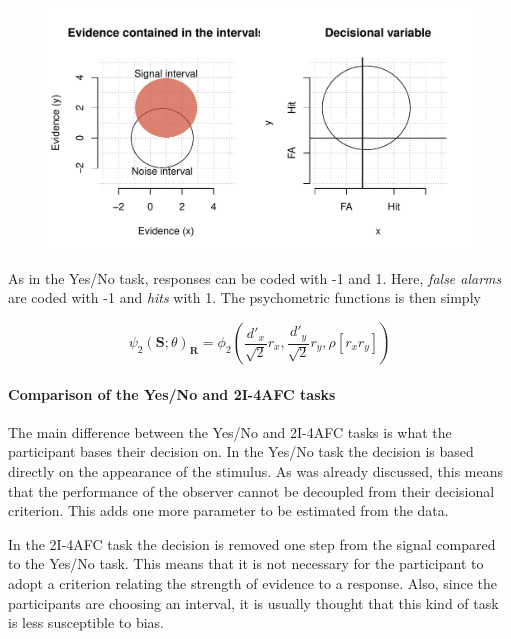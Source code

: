 \documentclass{article}\usepackage{knitr}
\begin{document}
\begin{figure}
\centering
\begin{knitrout}
\color{fgcolor}
\includegraphics[width=\maxwidth]{figure/unnamed-chunk-10-1} 

\end{knitrout}
\caption{}
\label{fig:2I4AFC}
\end{figure}

As in the Yes/No task, responses can be coded with -1 and 1. Here, \textit{false alarms} are coded with -1 and \textit{hits} with 1.  The psychometric functions is then simply

\begin{equation}
\psi_2(\bm{S}; \theta)_{\bm{R}} = \phi_2(\frac{d'_x}{\sqrt{2}}r_x, \frac{d'_y}{\sqrt{2}} r_y, \rho [r_x r_y])
\label{eq:generalPfun2}
\end{equation}

\paragraph{Comparison of the Yes/No and 2I-4AFC tasks}

The main difference between the Yes/No and 2I-4AFC tasks is what the participant bases their decision on. In the Yes/No task the decision is based directly on the appearance of the stimulus. As was already discussed, this means that the performance of the observer cannot be decoupled from their decisional criterion. This adds one more parameter to be estimated from the data. 

In the 2I-4AFC task the decision is removed one step from the signal compared to the Yes/No task. This means that it is not necessary for the participant to adopt a criterion relating the strength of evidence to a response. Also, since the participants are choosing an interval, it is usually thought that this kind of task is less susceptible to bias.
\end{document}
